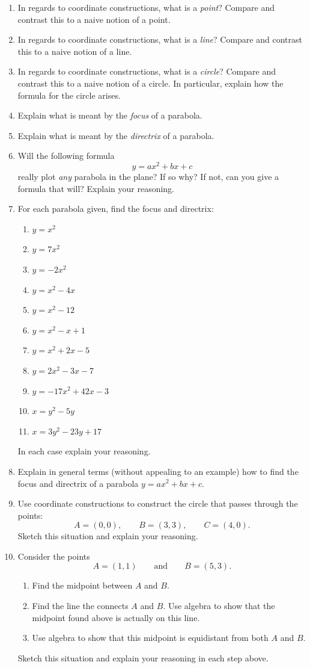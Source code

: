 \begin{problems}
\begin{enumerate}
\item In regards to coordinate constructions, what is a
  \textit{point}?  Compare and contrast this to a naive notion of a
  point.
\item In regards to coordinate constructions, what is a \textit{line}?
  Compare and contrast this to a naive notion of a line.
\item In regards to coordinate constructions, what is a
  \textit{circle}?  Compare and contrast this to a naive notion of a
  circle. In particular, explain how the formula for the circle
  arises.
\item Explain what is meant by the \textit{focus} of a parabola.
\item Explain what is meant by the \textit{directrix} of a parabola.
\item Will the following formula
\[
y = ax^2 + bx + c
\]
really plot \textit{any} parabola in the plane? If so why? If not, can you give
a formula that will? Explain your reasoning.

\item For each parabola given, find the focus and directrix:
\begin{enumerate}
\item $y = x^2$ 
\item $y = 7x^2$
\item $y = -2x^2$
\item $y = x^2 - 4x$
\item $y = x^2 -12$
\item $y = x^2-x+1$
\item $y = x^2+2x-5$
\item $y = 2x^2-3x-7$
\item $y = -17x^2+42x-3$
\item $x = y^2 -5y$
\item $x = 3y^2 -23 y + 17$
\end{enumerate}
In each case explain your reasoning.
\item Explain in general terms (without appealing to an example) how
  to find the focus and directrix of a parabola $y = ax^2 + bx +c$.
\item Use coordinate constructions to construct the circle that passes
  through the points:
\[
A = (0,0), \qquad B = (3,3), \qquad C = (4,0).
\]
Sketch this situation and explain your reasoning.
\item Consider the points 
\[
A = (1,1) \qquad\text{and}\qquad B=(5,3).
\]
\begin{enumerate}
\item Find the midpoint between $A$ and $B$. 
\item Find the line the connects $A$ and $B$. Use algebra to show that
  the midpoint found above is actually on this line.
\item Use algebra to show that this midpoint is equidistant from both
  $A$ and $B$.
\end{enumerate}
Sketch this situation and explain your reasoning in each step above.


\end{enumerate}
\end{problems}
